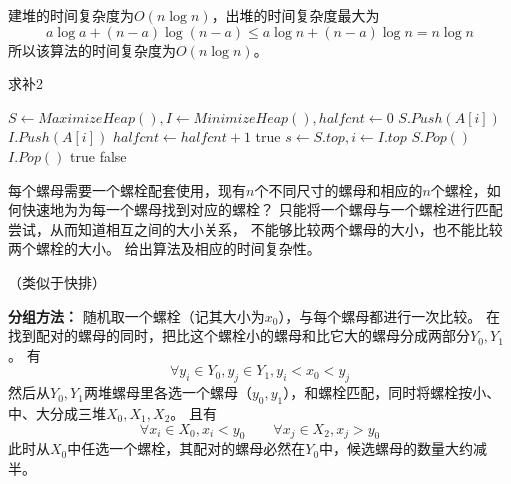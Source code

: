 \documentclass[answers]{exam}
\begin{document}
\begin{questions}
\begin{solution}
        建堆的时间复杂度为$O(n \log n)$，出堆的时间复杂度最大为\[
            a \log a + (n-a) \log (n-a) \le a \log n + (n-a) \log n = n \log n
        \]
        所以该算法的时间复杂度为$O(n\log n)$。

        \begin{algorithm}[H]
            \caption{求补2}\label{0330:Composite2}
            \begin{algorithmic}[1]
                \State $S \gets MaximizeHeap(), I \gets MinimizeHeap(), halfcnt \gets 0$
                 
                \State $S.Push(A[i])$
                \State $I.Push(A[i])$
                \Else {}
                \State $halfcnt \gets halfcnt + 1$
                \EndIf
                \EndFor
                 
                \State \Return \textsf{true}
                \EndIf
                 
                \State $s \gets S.top, i \gets I.top$ 
                \State $S.Pop()$
                \State $I.Pop()$
                \Else {}
                \State \Return \textsf{true}
                \EndIf
                \EndWhile
                \State \Return \textsf{false}
            \end{algorithmic}
        \end{algorithm}
    \end{solution}

    \question 每个螺母需要一个螺栓配套使用，现有$n$个不同尺寸的螺母和相应的$n$个螺栓，如何快速地为为每一个螺母找到对应的螺栓？
    只能将一个螺母与一个螺栓进行匹配尝试，从而知道相互之间的大小关系，
    不能够比较两个螺母的大小，也不能比较两个螺栓的大小。
    给出算法及相应的时间复杂性。
    \begin{solution}
        （类似于快排）

        \textbf{分组方法：}
        随机取一个螺栓（记其大小为$x_0$），与每个螺母都进行一次比较。
        在找到配对的螺母的同时，把比这个螺栓小的螺母和比它大的螺母分成两部分$Y_0, Y_1$。
        有\[
            \forall y_i \in Y_0, y_j \in Y_1,  y_i < x_0 < y_j
        \]
        然后从$Y_0, Y_1$两堆螺母里各选一个螺母（$y_0, y_1$），和螺栓匹配，同时将螺栓按小、中、大分成三堆$X_0, X_1, X_2$。
        且有\[
            \forall x_i \in X_0, x_i < y_0  \quad\quad \forall x_j \in X_2, x_j > y_0
        \]
        此时从$X_0$中任选一个螺栓，其配对的螺母必然在$Y_0$中，候选螺母的数量大约减半。


\end{solution}
\end{questions}
\end{document}

